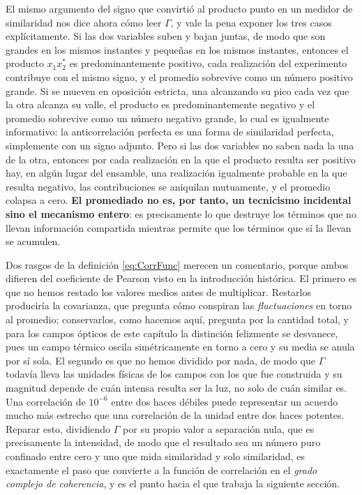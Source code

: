 	El mismo argumento del signo que convirtió al producto punto en un medidor de similaridad nos dice ahora cómo leer $\Gamma$, y vale la pena exponer los tres casos explícitamente. Si las dos variables suben y bajan juntas, de modo que son grandes en los mismos instantes y pequeñas en los mismos instantes, entonces el producto $x_1 x_2^*$ es predominantemente positivo, cada realización del experimento contribuye con el mismo signo, y el promedio sobrevive como un número positivo grande. Si se mueven en oposición estricta, una alcanzando su pico cada vez que la otra alcanza su valle, el producto es predominantemente negativo y el promedio sobrevive como un número negativo grande, lo cual es igualmente informativo: la anticorrelación perfecta es una forma de similaridad perfecta, simplemente con un signo adjunto. Pero si las dos variables no saben nada la una de la otra, entonces por cada realización en la que el producto resulta ser positivo hay, en algún lugar del ensamble, una realización igualmente probable en la que resulta negativo, las contribuciones se aniquilan mutuamente, y el promedio colapsa a cero. \textbf{El promediado no es, por tanto, un tecnicismo incidental sino el mecanismo entero}: es precisamente lo que destruye los términos que no llevan información compartida mientras permite que los términos que sí la llevan se acumulen.

	Dos rasgos de la definición \eqref{eq:CorrFunc} merecen un comentario, porque ambos difieren del coeficiente de Pearson visto en la introducción histórica. El primero es que no hemos restado los valores medios antes de multiplicar. Restarlos produciría la covarianza, que pregunta cómo conspiran las \textit{fluctuaciones} en torno al promedio; conservarlos, como hacemos aquí, pregunta por la cantidad total, y para los campos ópticos de este capítulo la distinción felizmente se desvanece, pues un campo térmico oscila simétricamente en torno a cero y su media se anula por sí sola. El segundo es que no hemos dividido por nada, de modo que $\Gamma$ todavía lleva las unidades físicas de los campos con los que fue construida y su magnitud depende de cuán intensa resulta ser la luz, no solo de cuán similar es. Una correlación de $10^{-6}$ entre dos haces débiles puede representar un acuerdo mucho más estrecho que una correlación de la unidad entre dos haces potentes. Reparar esto, dividiendo $\Gamma$ por su propio valor a separación nula, que es precisamente la intensidad, de modo que el resultado sea un número puro confinado entre cero y uno que mida similaridad y solo similaridad, es exactamente el paso que convierte a la función de correlación en el \textit{grado complejo de coherencia}, y es el punto hacia el que trabaja la siguiente sección.

